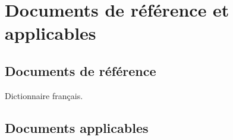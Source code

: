 
\section{Documents de référence et applicables}
    
    \subsection{Documents de référence}
        Dictionnaire français.
    \subsection{Documents applicables}
\vfill
\pagebreak

